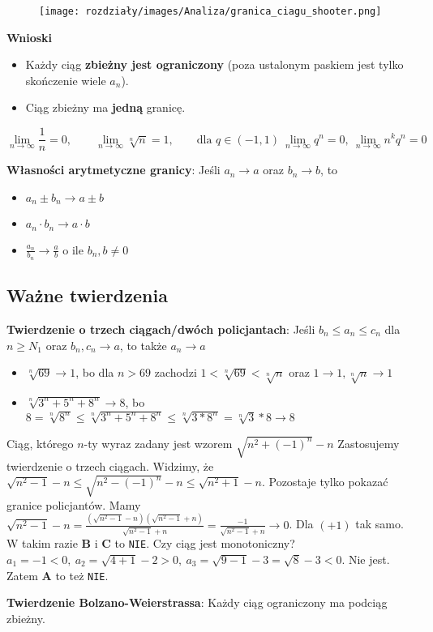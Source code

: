 \begin{figure}[h]
    \centering
    \texttt{[image: rozdziały/images/Analiza/granica\_ciagu\_shooter.png]}
\end{figure}

\textbf{Wnioski} 
\begin{itemize}
    \item Każdy ciąg \textbf{zbieżny jest ograniczony} (poza ustalonym paskiem jest tylko skończenie wiele $a_n$). 
    \item Ciąg zbieżny ma \textbf{jedną} granicę.
\end{itemize}
\begin{example}
    $$
    \lim_{n\to\infty}\frac{1}{n}=0, \qquad \lim_{n\to\infty}\sqrt[n]{n}=1, \qquad \mbox{dla } q\in(-1,1) \ \lim_{n\to\infty}q^n = 0, \ \lim_{n\to\infty}n^kq^n=0
    $$
\end{example}
\textbf{Własności arytmetyczne granicy}:
Jeśli $a_n \to a$ oraz $b_n \to b$, to
\begin{itemize}
    \item $a_n \pm b_n \to a \pm b$
    \item $a_n\cdot b_n \to a \cdot b$
    \item $\frac{a_n}{b_n}\to \frac{a}{b}$ o ile $b_n, b \neq 0$
\end{itemize}
\subsection{Ważne twierdzenia}
\textbf{Twierdzenie o trzech ciągach/dwóch policjantach}:
Jeśli $b_n \le a_n \le c_n$ dla $n\ge N_1$ oraz $b_n, c_n \to a$, to także $a_n \to a$
\begin{example}
\begin{itemize}
    \item $\sqrt[n]{69}\to 1$, bo dla $n>69$ zachodzi $1 < \sqrt[n]{69} < \sqrt[n]{n}$ oraz $1\to 1, \sqrt[n]{n}\to 1$
    \item $\sqrt[n]{3^n + 5^n + 8^n}\to 8$, bo $8=\sqrt[n]{8^n} \le \sqrt[n]{3^n + 5^n + 8^n} \le \sqrt[n]{3 * 8^n} = \sqrt[n]{3}* 8\to 8 $
\end{itemize}
\end{example}
\begin{exam}
    Ciąg, którego $n$-ty wyraz zadany jest wzorem $\sqrt{n^2+(-1)^n}-n$
    Zastosujemy twierdzenie o trzech ciągach. Widzimy, że $\sqrt{n^2 - 1} - n \le \sqrt{n^2 - (-1)^n} - n \le \sqrt{n^2 + 1} - n$. Pozostaje tylko pokazać granice policjantów. Mamy $\sqrt{n^2 - 1} - n = \frac{(\sqrt{n^2 - 1} - n)(\sqrt{n^2 - 1} + n)}{\sqrt{n^2-1}+n}=\frac{-1}{\sqrt{n^2-1}+n} \to 0$. Dla $(+1)$ tak samo. W takim razie \textbf{B} i \textbf{C} to \texttt{NIE}. Czy ciąg jest monotoniczny? $a_1 = -1 < 0, \ a_2=\sqrt{4 + 1} - 2 > 0, \ a_3=\sqrt{9-1}-3=\sqrt{8}-3 < 0$. Nie jest. Zatem \textbf{A} to też \texttt{NIE}.
\end{exam}
\textbf{Twierdzenie Bolzano-Weierstrassa}:
Każdy ciąg ograniczony ma podciąg zbieżny.

